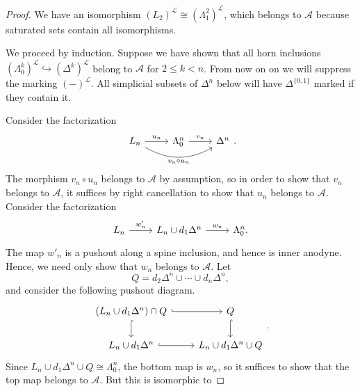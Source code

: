 \documentclass[main.tex]{subfiles}
\begin{document}
\begin{proof}
  We have an isomorphism $(L_{2})^{\mathcal{L}} \cong (\Lambda^{2}_{1})^{\mathcal{L}}$, which belongs to $\mathcal{A}$ because saturated sets contain all isomorphisms.

  We proceed by induction. Suppose we have shown that all horn inclusions $(\Lambda^{k}_{0})^{\mathcal{L}} \hookrightarrow (\Delta^{k})^{\mathcal{L}}$ belong to $\mathcal{A}$ for $2 \leq k < n$. From now on on we will suppress the marking $(-)^{\mathcal{L}}$. All simplicial subsets of $\Delta^{n}$ below will have $\Delta^{\{0, 1\}}$ marked if they contain it.

  Consider the factorization
  \begin{equation*}
    \begin{tikzcd}
      L_{n}
      \arrow[r, "u_{n}"]
      \arrow[rr, bend right, swap, "v_{n} \circ u_{n}"]
      & \Lambda^{n}_{0}
      \arrow[r, "v_{n}"]
      & \Delta^{n}
    \end{tikzcd}.
  \end{equation*}
  The morphism $v_{n} \circ u_{n}$ belongs to $\mathcal{A}$ by assumption, so in order to show that $v_{n}$ belongs to $\mathcal{A}$, it suffices by right cancellation to show that $u_{n}$ belongs to $\mathcal{A}$. Consider the factorization
  \begin{equation*}
    \begin{tikzcd}
      L_{n}
      \arrow[r, "w'_{n}"]
      & L_{n} \cup d_{1} \Delta^{n}
      \arrow[r, "w_{n}"]
      & \Lambda^{n}_{0}.
    \end{tikzcd}
  \end{equation*}
  The map $w'_{n}$ is a pushout along a spine inclusion, and hence is inner anodyne. Hence, we need only show that $w_{n}$ belongs to $\mathcal{A}$. Let
  \begin{equation*}
    Q = d_{2} \Delta^{n} \cup \cdots \cup d_{n} \Delta^{n},
  \end{equation*}
  and consider the following pushout diagram.
  \begin{equation*}
    \begin{tikzcd}
      (L_{n} \cup d_{1}\Delta^{n}) \cap Q
      \arrow[r, hook]
      \arrow[d, hook]
      & Q
      \arrow[d, hook]
      \\
      L_{n} \cup d_{1} \Delta^{n}
      \arrow[r, hook]
      & L_{n} \cup d_{1}\Delta^{n} \cup Q
    \end{tikzcd}.
  \end{equation*}
  Since $L_{n} \cup d_{1} \Delta^{n} \cup Q \cong \Lambda^{n}_{0}$, the bottom map is $w_{n}$, so it suffices to show that the top map belongs to $\mathcal{A}$. But this is isomorphic to

\end{proof}
\end{document}
